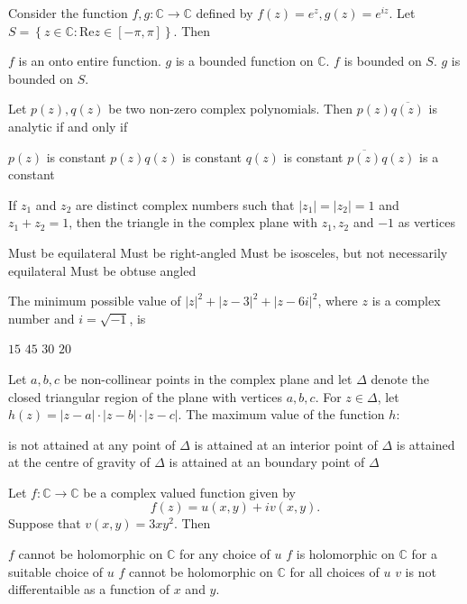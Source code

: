 \documentclass[10pt]{exam}
\newcommand{\C}{\ensuremath{\mathbb{C}}}
\newcommand{\set}[1]{\ensuremath{\left \{ {#1} \right \}}}
\begin{document}
\begin{questions}
\question 
Consider the function $f,g:\C \rightarrow \C$ defined by $f(z) = e^z, g(z) = e^{iz}$. Let $S = \set{z \in \C: \mbox{Re}z \in [-\pi, \pi] }$. Then 

\begin{choices}
\choice $f$ is an onto entire function.
\choice $g$ is a bounded function on $\C$.
\choice $f$ is bounded on $S$. 
\choice $g$ is bounded on $S$.
\end{choices}

\question 
Let $p(z), q(z)$ be two non-zero complex polynomials. Then $p(z)\overline{q(z)}$ is analytic if and only if 

\begin{choices}
\choice $p(z)$ is constant 
\choice $p(z)q(z)$ is constant 
\choice $q(z)$ is constant 
\choice $\overline{p(z)}q(z)$ is a constant 
\end{choices}

\question 
If $z_1$ and $z_2$ are distinct complex numbers such that $|z_1| = |z_2| = 1$ and $z_1 + z_2 = 1$, then the triangle in the complex plane with $z_1, z_2$ and $-1$ as vertices 

\begin{choices}
\choice Must be equilateral
\choice Must be right-angled
\choice Must be isosceles, but not necessarily equilateral
\choice Must be obtuse angled
\end{choices}


\question 
The minimum possible value of $|z|^2 + |z - 3|^2 + |z - 6i|^2$, where $z$ is a complex number and $i = \sqrt{-1}$, is 

\begin{oneparcheckboxes}
\choice $15$
\choice $45$
\choice $30$
\choice $20$
\end{oneparcheckboxes}

\question 
Let $a,b,c$ be non-collinear points in the complex plane and let $\Delta$ denote the closed triangular region of the plane with vertices $a,b,c$. For $z \in \Delta$, let $h(z) = |z - a| \cdot |z - b| \cdot |z - c|$. The maximum value of the function $h$: 

\begin{checkboxes}
\choice is not attained at any point of $\Delta$ 
\choice is  attained at an interior  point of $\Delta$ 
\choice is  attained at the centre of gravity of $\Delta$ 
\choice is  attained at an boundary  point of $\Delta$ 
\end{checkboxes}

\question 
Let $f : \C \rightarrow \C $ be a complex valued function given by 
$$ f(z) = u(x,y) + iv(x,y) .$$
Suppose that $v(x,y) = 3xy^2$. Then 
\begin{choices}
\choice $f$ cannot be holomorphic on $\C$ for any choice of $u$ 
\choice $f$ is  holomorphic on $\C$ for a suitable choice of $u$ 
\choice $f$ cannot be holomorphic on $\C$ for all choices of $u$ 
\choice $v$ is not differentaible as a function of $x$ and $y$. 
\end{choices}



\end{questions}
\end{document}
